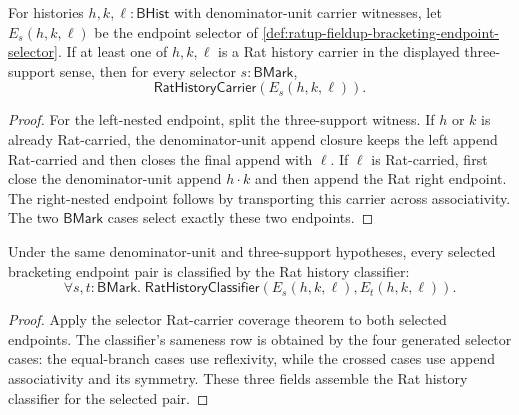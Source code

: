 \begin{theorem}
\label{thm:ratup-fieldup-bracketing-selector-rat-carrier-coverage}
For histories $h,k,\ell:\mathsf{BHist}$ with denominator-unit carrier
witnesses, let $E_s(h,k,\ell)$ be the endpoint selector of
\autoref{def:ratup-fieldup-bracketing-endpoint-selector}. If at least one of
$h,k,\ell$ is a Rat history carrier in the displayed three-support sense, then
for every selector $s:\mathsf{BMark}$,
$$
\mathsf{RatHistoryCarrier}(E_s(h,k,\ell)).
$$
\end{theorem}
\begin{proof}
For the left-nested endpoint, split the three-support witness. If $h$ or $k$
is already Rat-carried, the denominator-unit append closure keeps the left
append Rat-carried and then closes the final append with $\ell$. If $\ell$ is
Rat-carried, first close the denominator-unit append $h\cdot k$ and then append
the Rat right endpoint. The right-nested endpoint follows by transporting this
carrier across associativity. The two $\mathsf{BMark}$ cases select exactly
these two endpoints.
\end{proof}

\begin{theorem}
\label{thm:ratup-fieldup-bracketing-selector-rat-classifier-coverage}
Under the same denominator-unit and three-support hypotheses, every selected
bracketing endpoint pair is classified by the Rat history classifier:
$$
\forall s,t:\mathsf{BMark}.\;
\mathsf{RatHistoryClassifier}(E_s(h,k,\ell),E_t(h,k,\ell)).
$$
\end{theorem}
\begin{proof}
Apply the selector Rat-carrier coverage theorem to both selected endpoints.
The classifier's sameness row is obtained by the four generated selector cases:
the equal-branch cases use reflexivity, while the crossed cases use append
associativity and its symmetry. These three fields assemble the Rat history
classifier for the selected pair.
\end{proof}


